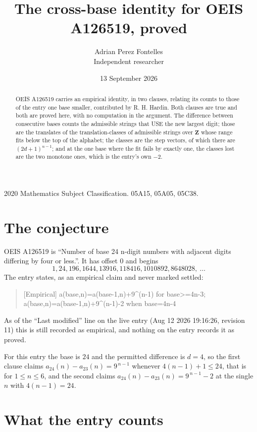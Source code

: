 \documentclass[11pt,a4paper]{article}
\title{The cross-base identity for OEIS A126519, proved}
\author{Adrian Perez Fontelles\\ \small Independent researcher}
\date{13 September 2026}
\theoremstyle{plain}
\theoremstyle{definition}
\begin{document}
\maketitle

\begin{abstract}
OEIS A126519 carries an empirical identity, in two clauses, relating its counts to those of the
entry one base smaller, contributed by R. H. Hardin. Both clauses are true and both are proved
here, with no computation in the argument. The difference between consecutive bases counts the
admissible strings that USE the new largest digit; those are the translates of the
translation-classes of admissible strings over $\mathbf{Z}$ whose range fits below the top of
the alphabet; the classes are the step vectors, of which there are $(2d+1)^{n-1}$; and at the
one base where the fit fails by exactly one, the classes lost are the two monotone ones, which
is the entry's own $-2$.
\end{abstract}

\noindent\small 2020 Mathematics Subject Classification. 05A15, 05A05, 05C38.\normalsize

\section{The conjecture}

OEIS A126519 is ``Number of base 24 n-digit numbers with adjacent digits differing by four or less.''. It has offset $0$ and begins
\[
1, 24, 196, 1644, 13916, 118416, 1010892, 8648028,\ \dots
\]
The entry states, as an empirical claim and never marked settled:
\begin{quote}
[Empirical] a(base,n)=a(base-1,n)+9\textasciicircum{}(n-1) for base>=4n-3; a(base,n)=a(base-1,n)+9\textasciicircum{}(n-1)-2 when base=4n-4
\end{quote}
As of the ``Last modified'' line on the live entry (Aug 12 2026 19:16:26, revision 11)
this is still recorded as empirical, and nothing on the entry records it as proved.

For this entry the base is $24$ and the permitted difference is $d=4$, so the first clause
claims $a_{24}(n)-a_{23}(n)=9^{\,n-1}$ whenever $4(n-1)+1\le24$, that is for
$1\le n\le6$, and the second claims $a_{24}(n)-a_{23}(n)=9^{\,n-1}-2$ at the single
$n$ with $4(n-1)=24$.

\section{What the entry counts}
\end{document}
